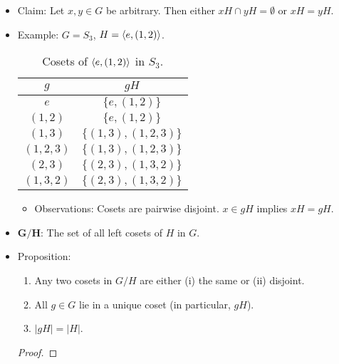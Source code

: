 \documentclass[../notes.tex]{subfiles}
\begin{document}
\begin{itemize}
\begin{itemize}
    \end{itemize}
    \item Claim: Let $x,y\in G$ be arbitrary. Then either $xH\cap yH=\emptyset$ or $xH=yH$.
    \item Example: $G=S_3$, $H=\left\langle{e,(1,2)}\right\rangle$.
    \begin{table}[h!]
        \centering
        \small
        \renewcommand{\arraystretch}{1.2}
        \begin{tabular}{c|c}
            $g$ & $gH$\\
            \hline
            $e$ & $\{e,(1,2)\}$\\
            $(1,2)$ & $\{e,(1,2)\}$\\
            $(1,3)$ & $\{(1,3),(1,2,3)\}$\\
            $(1,2,3)$ & $\{(1,3),(1,2,3)\}$\\
            $(2,3)$ & $\{(2,3),(1,3,2)\}$\\
            $(1,3,2)$ & $\{(2,3),(1,3,2)\}$\\
        \end{tabular}
        \caption{Cosets of $\left\langle{e,(1,2)}\right\rangle$ in $S_3$.}
        \label{tab:S3Cosets}
    \end{table}
    \begin{itemize}
        \item Observations: Cosets are pairwise disjoint. $x\in gH$ implies $xH=gH$.
    \end{itemize}
    \item $\bm{G/H}$: The set of all left cosets of $H$ in $G$.
    \item Proposition:
    \begin{enumerate}
        \item Any two cosets in $G/H$ are either (i) the same or (ii) disjoint.
        \item All $g\in G$ lie in a unique coset (in particular, $gH$).
        \item $|gH|=|H|$.
    \end{enumerate}
    \begin{proof}



\end{proof}
\end{itemize}
\end{document}
